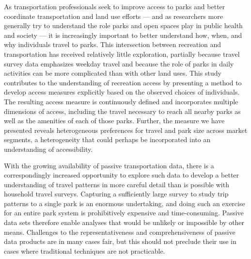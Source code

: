 \documentclass[]{elsarticle} %
\begin{document}
As transportation professionals seek to improve access to parks and better
coordinate transportation and land use efforts --- and as researchers more
generally try to understand the role parks and open spaces play in public health
and society --- it is increasingly important to better understand how, when, and
why individuals travel to parks. This intersection between recreation and
transportation has received relatively little exploration, partially because
travel survey data emphasizes weekday travel and because the role of parks in
daily activities can be more complicated than with other land uses. This study
contributes to the understanding of recreation access by presenting a method to
develop access measures explicitly based on the observed choices of individuals.
The resulting access measure is continuously defined and incorporates multiple
dimensions of access, including the travel necessary to reach all nearby parks
as well as the amenities of each of those parks. Further, the measure we have
presented reveals heterogeneous preferences for travel and park size across
market segments, a heterogeneity that could perhaps be incorporated into an
understanding of accessibility.

With the growing availability of passive transportation data, there is a
correspondingly increased opportunity to explore such data to develop a better
understanding of travel patterns in more careful detail than is possible with
household travel surveys. Capturing a sufficiently large survey to study trip
patterns to a single park is an enormous undertaking, and doing such an exercise
for an entire park system is prohibitively expensive and time-consuming. Passive
data sets therefore enable analyses that would be unlikely or impossible by
other means. Challenges to the representativeness and comprehensiveness of
passive data products are in many cases fair, but this should not preclude their
use in cases where traditional techniques are not practicable.


\end{document}
